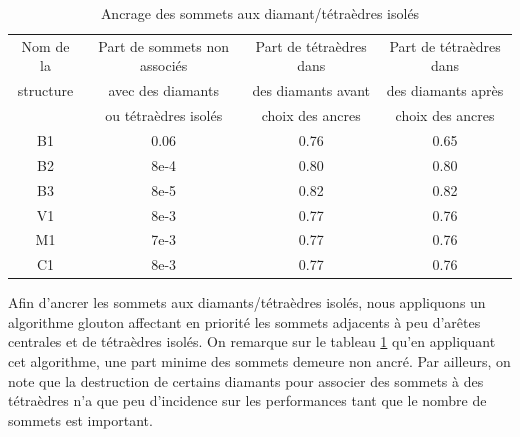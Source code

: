 \documentclass[a4paper,11pt,openany]{article}
\begin{document}
\noindent
\begin{table}[H]
\footnotesize
\centering
\begin{tabular}{|c | c | c | c |}
\hline
Nom de la & Part de sommets non associés & Part de tétraèdres dans  & Part de tétraèdres dans \\
structure&avec des diamants  & des diamants avant & des diamants après \\
& ou tétraèdres isolés & choix des ancres& choix des ancres\\
\hline
B1 & 0.06 & 0.76 & 0.65 \\
B2 & 8e-4 & 0.80 & 0.80 \\
B3 & 8e-5 & 0.82 & 0.82\\
V1 & 8e-3  & 0.77 & 0.76 \\
M1 & 7e-3 & 0.77 & 0.76\\
C1 & 8e-3 & 0.77 & 0.76 \\
\hline  
\end{tabular}
\label{Tab:results_ancres}
\caption{Ancrage des sommets aux diamant/tétraèdres isolés}
\end{table}
\noindent
Afin d'ancrer les sommets aux diamants/tétraèdres isolés, nous appliquons un algorithme glouton affectant en priorité les sommets adjacents à peu d'arêtes centrales et de tétraèdres isolés. On remarque sur le tableau \ref{Tab:results_ancres} qu'en appliquant cet algorithme, une part minime des sommets demeure non ancré. Par ailleurs, on note que la destruction de certains diamants pour associer des sommets à des tétraèdres n'a que peu d'incidence sur les performances tant que le nombre de sommets est important.
\end{document}
